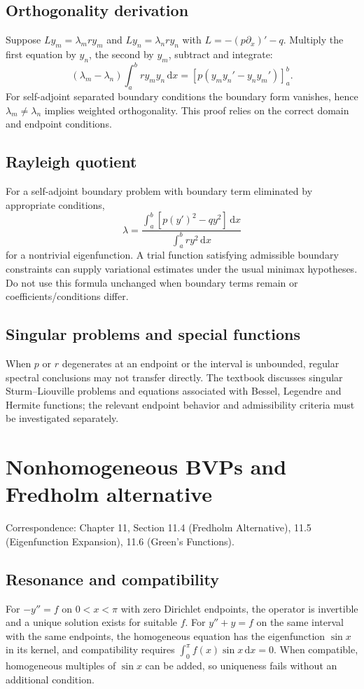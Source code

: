 \documentclass[11pt,letterpaper,oneside]{report}
\theoremstyle{definition}\newtheorem{definition}[theorem]{Definition}
\theoremstyle{remark}\newtheorem{remark}[theorem]{Remark}
\newcommand{\dd}{\,\mathrm{d}}
\begin{document}
\section{Orthogonality derivation}
Suppose $Ly_m=\lambda_m r y_m$ and $Ly_n=\lambda_n r y_n$ with $L=-(p\partial_x)'-q$. Multiply the first equation by $y_n$, the second by $y_m$, subtract and integrate:
\[(\lambda_m-\lambda_n)\int_a^b r y_my_n\dd x=\left[p(y_m y_n'-y_n y_m')\right]_a^b.\]
For self-adjoint separated boundary conditions the boundary form vanishes, hence $\lambda_m\ne\lambda_n$ implies weighted orthogonality. This proof relies on the correct domain and endpoint conditions.
\section{Rayleigh quotient}
For a self-adjoint boundary problem with boundary term eliminated by appropriate conditions,
\[\lambda=\frac{\int_a^b[p(y')^2-q y^2]\dd x}{\int_a^b r y^2\dd x}\]
for a nontrivial eigenfunction. A trial function satisfying admissible boundary constraints can supply variational estimates under the usual minimax hypotheses. Do not use this formula unchanged when boundary terms remain or coefficients/conditions differ.
\section{Singular problems and special functions}
When $p$ or $r$ degenerates at an endpoint or the interval is unbounded, regular spectral conclusions may not transfer directly. The textbook discusses singular Sturm--Liouville problems and equations associated with Bessel, Legendre and Hermite functions; the relevant endpoint behavior and admissibility criteria must be investigated separately.
\chapter{Nonhomogeneous BVPs and Fredholm alternative}
\begin{bookground}Correspondence: Chapter 11, Section 11.4 (Fredholm Alternative), 11.5 (Eigenfunction Expansion), 11.6 (Green's Functions).\end{bookground}
\section{Resonance and compatibility}
For $-y''=f$ on $0<x<\pi$ with zero Dirichlet endpoints, the operator is invertible and a unique solution exists for suitable $f$. For $y''+y=f$ on the same interval with the same endpoints, the homogeneous equation has the eigenfunction $\sin x$ in its kernel, and compatibility requires $\int_0^\pi f(x)\sin x\dd x=0$. When compatible, homogeneous multiples of $\sin x$ can be added, so uniqueness fails without an additional condition.
\end{document}
